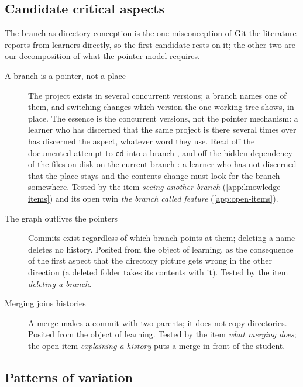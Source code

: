 \subsection{Candidate critical aspects}
\label{sec:branches-aspects}

The branch-as-directory conception is the one misconception of Git the
literature reports from learners directly, so the first candidate rests
on it; the other two are our decomposition of what the pointer model
requires.

\begin{description}
  \item[A branch is a pointer, not a place]
    The project exists in several concurrent versions; a branch names
    one of them, and switching changes which version the one working
    tree shows, in place.
    The essence is the concurrent versions, not the pointer mechanism:
    a learner who has discerned that the same project is there several
    times over has discerned the aspect, whatever word they use.
    Read off the documented attempt to \texttt{cd} into a branch
    \autocite{IsomottonenCochez2014}, and off the hidden dependency of
    the files on disk on the current branch
    \autocite{Church2014HiddenDependencies}: a learner who has not
    discerned that the place stays and the contents change must look for
    the branch somewhere.
    Tested by the item \emph{seeing another branch}
    (\cref{app:knowledge-items}) and its open twin \emph{the branch
    called feature} (\cref{app:open-items}).
  \item[The graph outlives the pointers]
    Commits exist regardless of which branch points at them; deleting a
    name deletes no history.
    Posited from the object of learning, as the consequence of the
    first aspect that the directory picture gets wrong in the other
    direction (a deleted folder takes its contents with it).
    Tested by the item \emph{deleting a branch}.
  \item[Merging joins histories]
    A merge makes a commit with two parents; it does not copy
    directories.
    Posited from the object of learning.
    Tested by the item \emph{what merging does}; the open item
    \emph{explaining a history} puts a merge in front of the student.
\end{description}

\subsection{Patterns of variation}

